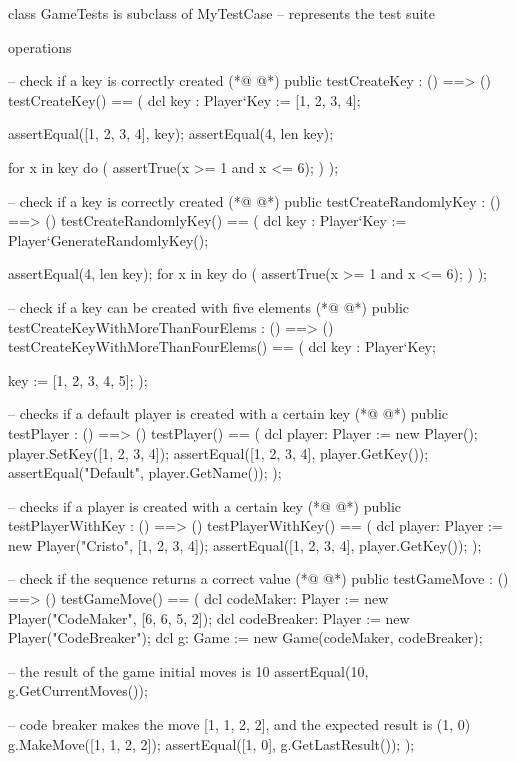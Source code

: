 \begin{vdmpp}[breaklines=true]
class GameTests is subclass of MyTestCase -- represents the test suite

operations

 -- check if a key is correctly created
(*@
\label{testCreateKey:6}
@*)
 public testCreateKey : () ==> ()
  testCreateKey() == (
   dcl key : Player`Key := [1, 2, 3, 4];
   
   assertEqual([1, 2, 3, 4], key);
   assertEqual(4, len key);
   
   for x in key do ( 
    assertTrue(x >= 1 and x <= 6);
   )
  );
  
 -- check if a key is correctly created
(*@
\label{testCreateRandomlyKey:19}
@*)
 public testCreateRandomlyKey : () ==> ()
  testCreateRandomlyKey() == (
   dcl key : Player`Key := Player`GenerateRandomlyKey();
   
   assertEqual(4, len key);
   for x in key do ( 
    assertTrue(x >= 1 and x <= 6);
   )
  );
  
  -- check if a key can be created with five elements
(*@
\label{testCreateKeyWithMoreThanFourElems:30}
@*)
 public testCreateKeyWithMoreThanFourElems : () ==> ()
  testCreateKeyWithMoreThanFourElems() == (
   dcl key : Player`Key;
   
   key := [1, 2, 3, 4, 5];
  );

 -- checks if a default player is created with a certain key
(*@
\label{testPlayer:38}
@*)
 public testPlayer : () ==> ()
  testPlayer() == (
  dcl player: Player := new Player();
  player.SetKey([1, 2, 3, 4]);
  assertEqual([1, 2, 3, 4], player.GetKey());
  assertEqual("Default", player.GetName());
  );
 
 -- checks if a player is created with a certain key
(*@
\label{testPlayerWithKey:47}
@*)
 public testPlayerWithKey : () ==> ()
  testPlayerWithKey() == (
  dcl player: Player := new Player("Cristo", [1, 2, 3, 4]);
  assertEqual([1, 2, 3, 4], player.GetKey());
  );
  
 -- check if the sequence returns a correct value
(*@
\label{testGameMove:54}
@*)
 public testGameMove : () ==> ()
  testGameMove() == (
   dcl codeMaker: Player := new Player("CodeMaker", [6, 6, 5, 2]);
    dcl codeBreaker: Player := new Player("CodeBreaker");
    dcl g: Game := new Game(codeMaker, codeBreaker);
    
    -- the result of the game initial moves is 10
    assertEqual(10, g.GetCurrentMoves());
    
    -- code breaker makes the move [1, 1, 2, 2], and the expected result is (1, 0)
    g.MakeMove([1, 1, 2, 2]);
    assertEqual([1, 0], g.GetLastResult());
  );
  

\end{vdmpp}
